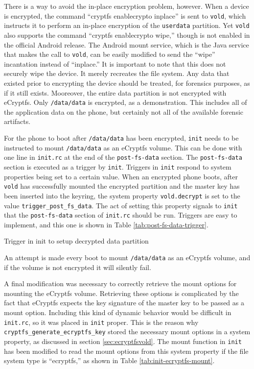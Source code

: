 There is a way to avoid the in-place encryption problem, however. When a device is encrypted, the command ``cryptfs enablecrypto
inplace'' is sent to \texttt{vold}, which instructs it to perform an in-place encryption of the \texttt{userdata} partition. Yet
\texttt{vold} also supports the command ``cryptfs enablecrypto wipe,'' though is not enabled in the official Android release. The
Android mount service, which is the Java service that makes the call to \texttt{vold}, can be easily modified to send the ``wipe''
incantation instead of ``inplace.'' It is important to note that this does not securely wipe the device. It merely recreates the
file system. Any data that existed prior to encrypting the device should be treated, for forensics purposes, as if it still exists.
Mooreover, the entire data partition is not encrypted with eCryptfs. Only \texttt{/data/data} is encrypted, as a demonstration. This
includes all of the application data on the phone, but certainly not all of the available forensic artifacts.

For the phone to boot after \texttt{/data/data} has been encrypted, \texttt{init} needs to be instructed to mount
\texttt{/data/data} as an eCryptfs volume. This can be done with one line in \texttt{init.rc} at the end of the
\texttt{post-fs-data} section. The \texttt{post-fs-data} section is executed as a trigger by \texttt{init}. Triggers in
\texttt{init} respond to system properties being set to a certain value. When an encrypted phone boots, after \texttt{vold} has
successfully mounted the encrypted partition and the master key has been inserted into the keyring, the system property
\texttt{vold.decrypt} is set to the value \texttt{trigger\_post\_fs\_data}. The act of setting this property signals to
\texttt{init} that the \texttt{post-fs-data} section of \texttt{init.rc} should be run. Triggers are easy to implement, and this one
is shown in Table \ref{tab:post-fs-data-trigger}.  
\begin{table}[htb] 
 
\caption{Trigger in init to setup decrypted data partition}
\label{tab:post-fs-data-trigger} 
\end{table} 
An attempt is made every boot to mount
\texttt{/data/data} as an eCryptfs volume, and if the volume is not encrypted it will silently fail. 

A final modification was necessary to correctly retrieve the mount options for mounting the eCryptfs volume. Retrieving these
options is complicated by the fact that eCryptfs expects the key signature of the master key to be passed as a mount option.
Including this kind of dynamic behavior would be difficult in \texttt{init.rc}, so it was placed in \texttt{init} proper. This is
the reason why \texttt{cryptfs\_generate\_ecryptfs\_key} stored the necessary mount options in a system property, as discussed in
section \ref{sec:ecryptfsvold}. The mount function in \texttt{init} has been modified to read the mount options from this system
property if the file system type is ``ecryptfs,'' as shown in Table \ref{tab:init-ecryptfs-mount}.

